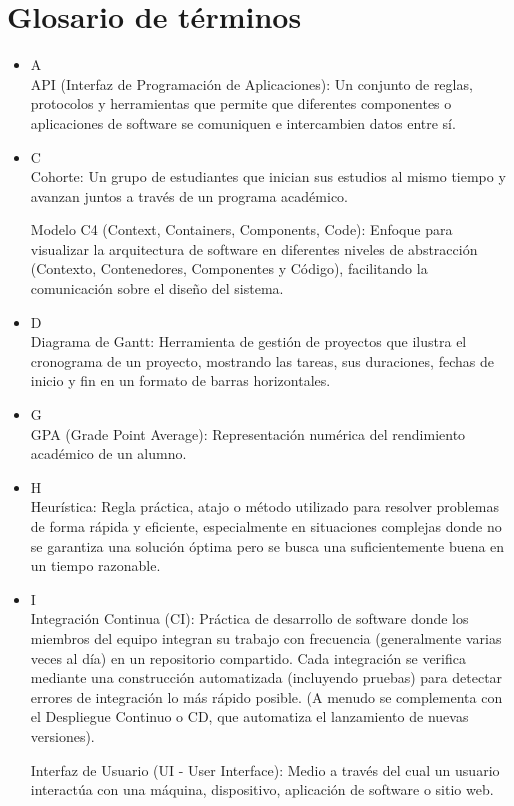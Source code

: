 \section*{Glosario de términos}

\begin{itemize}
    \item A \\
    API (Interfaz de Programación de Aplicaciones): Un conjunto de reglas, protocolos y herramientas que permite que diferentes componentes o aplicaciones de software se comuniquen e intercambien datos entre sí.

    \item C \\
    Cohorte: Un grupo de estudiantes que inician sus estudios al mismo tiempo y avanzan juntos a través de un programa académico.
    \par
    Modelo C4 (Context, Containers, Components, Code): Enfoque para visualizar la arquitectura de software en diferentes niveles de abstracción (Contexto, Contenedores, Componentes y Código), facilitando la comunicación sobre el diseño del sistema.

    \item D \\
    Diagrama de Gantt: Herramienta de gestión de proyectos que ilustra el cronograma de un proyecto, mostrando las tareas, sus duraciones, fechas de inicio y fin en un formato de barras horizontales.

    \item G \\
    GPA (Grade Point Average): Representación numérica del rendimiento académico de un alumno.

    \item H \\
    Heurística: Regla práctica, atajo o método utilizado para resolver problemas de forma rápida y eficiente, especialmente en situaciones complejas donde no se garantiza una solución óptima pero se busca una suficientemente buena en un tiempo razonable.

    \item I \\
    Integración Continua (CI): Práctica de desarrollo de software donde los miembros del equipo integran su trabajo con frecuencia (generalmente varias veces al día) en un repositorio compartido.
    Cada integración se verifica mediante una construcción automatizada (incluyendo pruebas) para detectar errores de integración lo más rápido posible. (A menudo se complementa con el Despliegue Continuo o CD, que automatiza el lanzamiento de nuevas versiones).
    \par
    Interfaz de Usuario (UI - User Interface): Medio a través del cual un usuario interactúa con una máquina, dispositivo, aplicación de software o sitio web.


\end{itemize}
